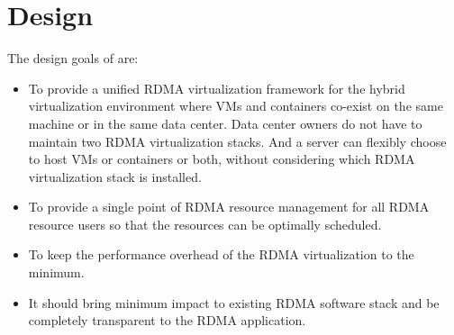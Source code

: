 \section{Design} \label{design}


The design goals of \sys are: 
\begin{itemize}
	\item To provide a unified RDMA virtualization framework for the hybrid virtualization environment where VMs and containers co-exist on the same machine or in the same data center. Data center owners do not have to maintain two RDMA virtualization stacks. And a server can flexibly choose to host VMs or containers or both, without considering which RDMA virtualization stack is installed.
	\item To provide a single point of RDMA resource management for all RDMA resource users so that the resources can be optimally scheduled.
	\item To keep the performance overhead of the RDMA virtualization to the minimum.
	\item It should bring minimum impact to existing RDMA software stack and be completely transparent to the RDMA application.
\end{itemize}


